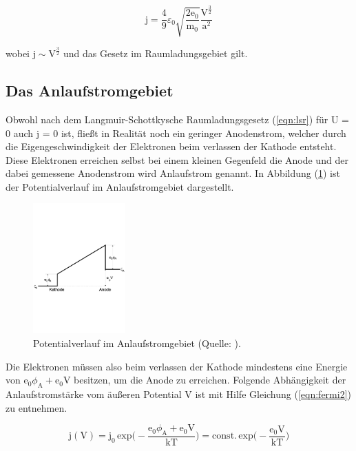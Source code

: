 \begin{equation}
\text{j}= \frac{4}{9} \varepsilon_0 \sqrt{\frac{2 \text{e}_0}{\text{m}_0}} \frac{\text{V}^{\frac{3}{2}}}{\text{a}^2}
\label{eqn:lsr}
\end{equation}

\noindent
wobei $ \text{j} \sim \text{V}^{\frac{3}{2}}$ und das Gesetz im Raumladungsgebiet gilt.

\subsection{Das Anlaufstromgebiet}

\noindent
Obwohl nach dem Langmuir-Schottkysche Raumladungsgesetz (\ref{eqn:lsr}) für U = 0 auch j = 0 ist, 
fließt in Realität noch ein geringer Anodenstrom, 
welcher durch die Eigengeschwindigkeit der Elektronen beim verlassen der Kathode entsteht.
Diese Elektronen erreichen selbst bei einem kleinen Gegenfeld die Anode und der dabei gemessene Anodenstrom wird Anlaufstrom genannt.
In Abbildung (\ref{fig:anlauf}) ist der Potentialverlauf im Anlaufstromgebiet dargestellt.

\begin{figure}
    \centering
       \includegraphics[height=5cm]{anlauf.pdf}
       \caption{Potentialverlauf im Anlaufstromgebiet (Quelle: \cite{V504}).}
       \label{fig:anlauf}
\end{figure}

\noindent
Die Elektronen müssen also beim verlassen der Kathode mindestens eine Energie von $\text{e}_0 \phi_\text{A} + \text{e}_0 \text{V}$ besitzen,
um die Anode zu erreichen.
Folgende Abhängigkeit der Anlaufstromstärke vom äußeren Potential V ist mit Hilfe Gleichung (\ref{eqn:fermi2}) zu entnehmen.

\begin{equation}
\text{j}(\text{V}) = \text{j}_0 \, \text{exp} \biggl(-\frac{\text{e}_0 \phi_\text{A} + \text{e}_0 \text{V} }{\text{kT}} \biggr) = \text{const.} \, \text{exp} \biggl(-\frac{\text{e}_0 \text{V} }{\text{kT}} \biggr)
\label{eqn:anlauf}
\end{equation}


